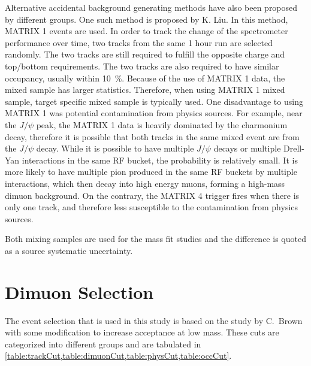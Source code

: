 \documentclass[../main.tex]{subfiles}
\begin{document}
Alternative accidental background generating methods have also been proposed by different groups.
One such method is proposed by K. Liu. In this method, MATRIX 1 events are used. In order to track the
change of the spectrometer performance over time, two tracks from the same 1 hour run are selected
randomly. The two tracks are still required to fulfill the opposite charge and top/bottom requirements.
The two tracks are also required to have similar occupancy, usually within \SI{10}{\percent}.
Because of the use of MATRIX 1 data, the mixed sample has larger statistics. Therefore, when
using MATRIX 1 mixed sample, target specific mixed sample is typically used. One disadvantage to using MATRIX 1
was potential contamination from physics sources. For example, near the $J/\psi$ peak, the MATRIX 1
data is heavily dominated by the charmonium decay, therefore it is possible that both tracks in the same
mixed event are from the $J/\psi$ decay. While it is possible to have multiple $J/\psi$ decays or
multiple Drell-Yan interactions in the same RF bucket,
the probability is relatively small. It is more likely to have multiple pion produced in the same RF
buckets by multiple interactions, which then decay into high energy muons, forming a high-mass
dimuon background.
On the contrary, the MATRIX 4 trigger fires when there is only one track, and therefore less
susceptible to the contamination from physics sources.

Both mixing samples are used for the mass fit studies and the difference is quoted as a source systematic
uncertainty.

\section{Dimuon Selection}
The event selection that is used in this study is based on the study by C.~Brown
\cite{chuck-2111} with some modification to increase acceptance at low mass. These cuts
are categorized into different groups and are tabulated in \cref{table:trackCut,table:dimuonCut,table:physCut,table:occCut}.
\end{document}

